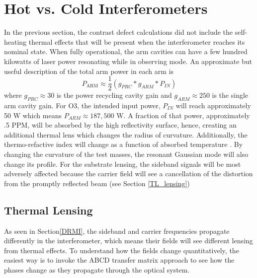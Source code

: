 	\section{Hot vs. Cold Interferometers}\label{sec:hotcoldifo}
		In the previous section, the contrast defect calculations did not include the self-heating thermal effects that will be present when the interferometer reaches its nominal state.
		When fully operational, the arm cavities can have a few hundred kilowatts of laser power resonating while in observing mode. 
		An approximate but useful description of the total arm power in each arm is
	\begin{equation}
		P_{\text{ARM}} \approx \frac{1}{2} (g_{PRC} * g_{ARM} * P_{IN})
	\end{equation}
	where $g_{PRC} \approx 30$ is the power recycling cavity gain and $g_{ARM} \approx 250$ is the single arm cavity gain.
		For O3, the intended input power, $P_{IN}$ will reach approximately 50 W which means $P_{ARM} \approx 187,500$ W. 
		A fraction of that power, approximately .5 PPM, will be absorbed by the high reflectivity surface, hence, creating an additional thermal lens which changes the radius of curvature.  
		Additionally, the thermo-refactive index will change as a function of absorbed temperature \cite{winkler_thermaldist}.
		By changing the curvature of the test masses, the resonant Gaussian mode will also change its profile.
		For the substrate lensing, the sideband signals will be most adversely affected because the carrier field will see a cancellation of the distortion from the promptly reflected beam (see Section \ref{TL_lensing})
	
	\subsection{Thermal Lensing}\label{Sec:TL_lensing}
	\cite{hiro_thermal_lens}
		As seen in Section\ref{DRMI}, the sideband and carrier frequencies propagate differently in the interferometer, which means their fields will see different lensing from thermal effects.
		To understand how the fields change quantitatively, the easiest way is to invoke the ABCD transfer matrix approach to see how the phases change as they propagate through the optical system.
